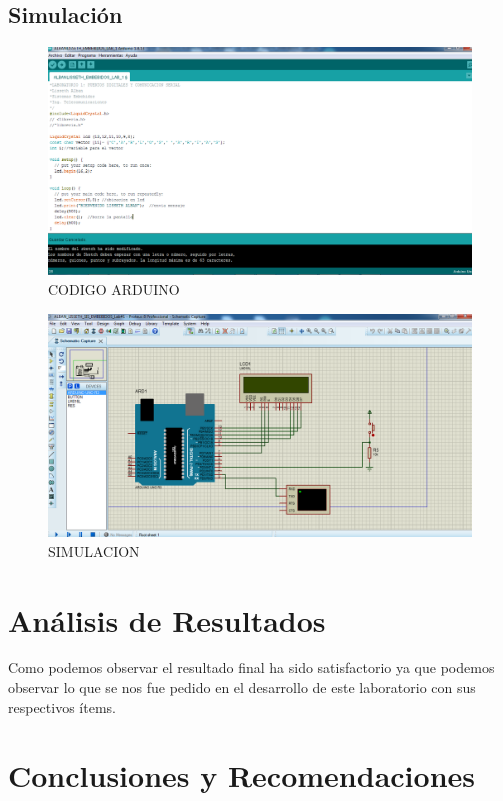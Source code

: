 \documentclass[10pt,a4paper]{article}
\begin{document}
\subsection{Simulación}
\begin{figure}[hb]
\centering
\caption{CODIGO ARDUINO}
\includegraphics[scale=0.5]{CODIGO ARDUINO.png}
\end{figure}
\begin{figure}[hb]
\centering
\caption{SIMULACION}
\includegraphics[scale=0.5]{SIMULACION.png}
\end{figure}

\section{Análisis de Resultados}
\begin{itemize}
Como podemos observar el resultado final ha sido satisfactorio ya que podemos observar lo que se nos fue pedido en el desarrollo de este laboratorio con sus respectivos ítems.
\end{itemize}

\section{Conclusiones y Recomendaciones}
\end{document}
